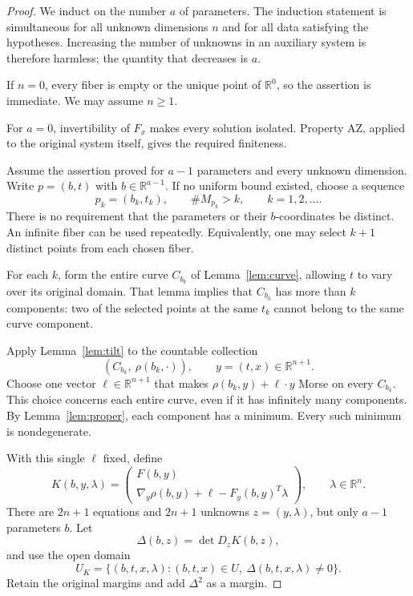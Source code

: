 \documentclass[11pt]{article}
\theoremstyle{definition}
\theoremstyle{remark}
\newcommand{\R}{\mathbb R}
\newcommand{\AZ}{\mathrm{AZ}}
\begin{document}
\begin{proof}
We induct on the number \(a\) of parameters. The induction statement
is simultaneous for all unknown dimensions \(n\) and for all data
satisfying the hypotheses. Increasing the number of unknowns in an
auxiliary system is therefore harmless; the quantity that decreases
is \(a\).

If \(n=0\), every fiber is empty or the unique point of \(\R^0\), so
the assertion is immediate. We may assume \(n\ge1\).

For \(a=0\), invertibility of \(F_x\) makes every solution isolated.
Property \(\AZ\), applied to the original system itself, gives the
required finiteness.

Assume the assertion proved for \(a-1\) parameters and every unknown
dimension. Write \(p=(b,t)\) with \(b\in\R^{a-1}\). If no uniform
bound existed, choose a sequence
\begin{equation}
 p_k=(b_k,t_k),\qquad \#M_{p_k}>k,\qquad k=1,2,\ldots.
 \label{eq:witness-square}
\end{equation}
There is no requirement that the parameters or their \(b\)-coordinates
be distinct. An infinite fiber can be used repeatedly. Equivalently,
one may select \(k+1\) distinct points from each chosen fiber.

For each \(k\), form the entire curve \(C_{b_k}\) of
Lemma~\ref{lem:curve}, allowing \(t\) to vary over its original
domain. That lemma implies that \(C_{b_k}\) has more than \(k\)
components: two of the selected points at the same \(t_k\) cannot
belong to the same curve component.

Apply Lemma~\ref{lem:tilt} to the countable collection
\[
 \left(C_{b_k},\ \rho(b_k,\cdot)\right),
 \qquad y=(t,x)\in\R^{n+1}.
\]
Choose one vector \(\ell\in\R^{n+1}\) that makes
\(\rho(b_k,y)+\ell\cdot y\) Morse on every \(C_{b_k}\).
This choice concerns each entire curve, even if it has infinitely
many components. By Lemma~\ref{lem:proper}, each component has a
minimum. Every such minimum is nondegenerate.

With this single \(\ell\) fixed, define
\begin{equation}
 K(b,y,\lambda)=
 \begin{pmatrix}
 F(b,y)\\
 \nabla_y\rho(b,y)+\ell-F_y(b,y)^T\lambda
 \end{pmatrix},\qquad \lambda\in\R^n.
 \label{eq:Ksquare}
\end{equation}
There are \(2n+1\) equations and \(2n+1\) unknowns
\(z=(y,\lambda)\), but only \(a-1\) parameters \(b\).
Let
\[
 \Delta(b,z)=\det D_zK(b,z),
\]
and use the open domain
\begin{equation}
 U_K=\{(b,t,x,\lambda):(b,t,x)\in U,\ \Delta(b,t,x,\lambda)\ne0\}.
 \label{eq:Kdomain}
\end{equation}
Retain the original margins and add \(\Delta^2\) as a margin.


\end{proof}
\end{document}
